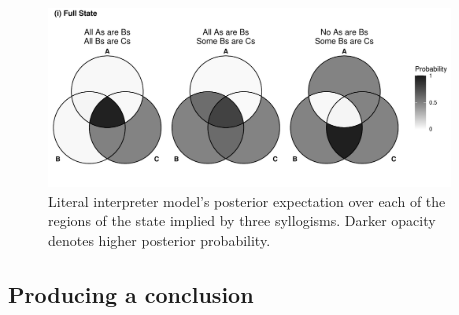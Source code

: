 \documentclass[floatsintext, doc]{apa6}
\begin{document}
%    


\begin{figure}[b]
    \centering
        \includegraphics[width = 0.95\textwidth]{figs/venn_literal_AA1_AI1_EI1_exp.pdf}
    \caption{ Literal interpreter model's posterior expectation over each of the regions of the state implied by three syllogisms. Darker opacity denotes higher posterior probability.}
    \label{fig:lit_state_qud}
\end{figure}







\subsection{Producing a conclusion}
\end{document}
